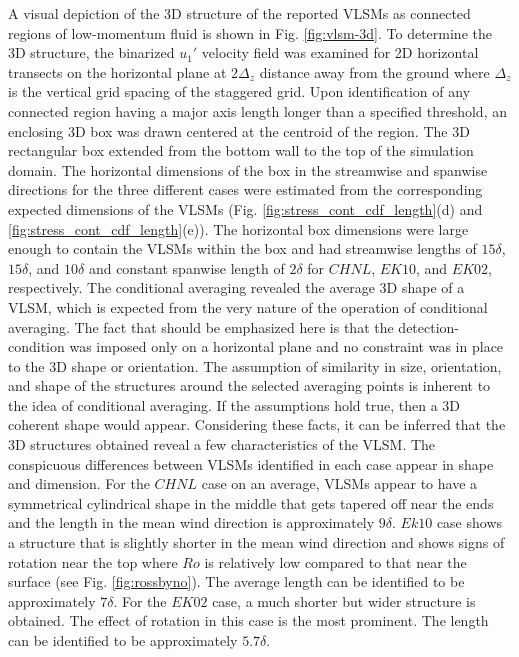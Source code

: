 A visual depiction of the 3D structure of the reported VLSMs as connected regions of low-momentum fluid is shown in Fig. \ref{fig:vlsm-3d}. To determine the 3D structure, the binarized $u_{1}'$ velocity field was examined for 2D horizontal transects on the horizontal plane at $2\Delta_z$ distance away from the ground where $\Delta_z$ is the vertical grid spacing of the staggered grid. Upon identification of any connected region having a major axis length longer than a specified threshold, an enclosing 3D box was drawn centered at the centroid of the region. The 3D rectangular box extended from the bottom wall to the top of the simulation domain. The horizontal dimensions of the box in the streamwise and spanwise directions for the three different cases were estimated from the corresponding expected dimensions of the VLSMs (Fig. \ref{fig:stress_cont_cdf_length}(d) and \ref{fig:stress_cont_cdf_length}(e)). The horizontal box dimensions were large enough to contain the VLSMs within the box and had streamwise lengths of $15\delta$, $15\delta$, and $10\delta$ and constant spanwise length of $2\delta$ for $CHNL$, $EK10$, and $EK02$, respectively.  The conditional averaging revealed the average 3D shape of a VLSM, which is expected from the very nature of the operation of conditional averaging. The fact that should be emphasized here is that the detection-condition was imposed only on a horizontal plane and no constraint was in place to the 3D shape or orientation. The assumption of similarity in size, orientation, and shape of the structures around the selected averaging points is inherent to the idea of conditional averaging. If the assumptions hold true, then a 3D coherent shape would appear.  Considering these facts, it can be inferred that the 3D structures obtained reveal a few characteristics of the VLSM.  The conspicuous differences between VLSMs identified in each case appear in shape and dimension. For the $CHNL$ case on an average, VLSMs appear to have a symmetrical cylindrical shape in the middle that gets tapered off near the ends and the length in the mean wind direction is approximately $9\delta$. $Ek10$ case shows a structure that is slightly shorter in the mean wind direction and shows signs of rotation near the top where $Ro$ is relatively low compared to that near the surface (see Fig. \ref{fig:rossbyno}). The average length can be identified to be approximately $7\delta$. For the $EK02$ case, a much shorter but wider structure is obtained. The effect of rotation in this case is the most prominent. The length can be identified to be approximately $5.7\delta$. 


